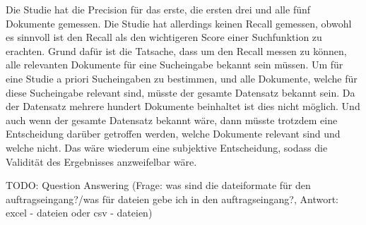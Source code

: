 Die Studie hat die Precision für das erste, die ersten drei und alle fünf Dokumente gemessen.
Die Studie hat allerdings keinen Recall gemessen, obwohl es sinnvoll ist den Recall als den wichtigeren Score einer Suchfunktion zu erachten.
Grund dafür ist die Tatsache, dass um den Recall messen zu können, alle relevanten Dokumente für eine Sucheingabe bekannt sein müssen.
Um für eine Studie a priori Sucheingaben zu bestimmen, und alle Dokumente, welche für diese Sucheingabe relevant sind, müsste der gesamte Datensatz bekannt sein.
Da der Datensatz mehrere hundert Dokumente beinhaltet ist dies nicht möglich.
Und auch wenn der gesamte Datensatz bekannt wäre, dann müsste trotzdem eine Entscheidung darüber getroffen werden, welche Dokumente relevant sind und welche nicht.
Das wäre wiederum eine subjektive Entscheidung, sodass die Validität des Ergebnisses anzweifelbar wäre.

TODO: Question Answering (Frage: was sind die dateiformate für den auftragseingang?/was für dateien gebe ich in den auftragseingang?, Antwort: excel - dateien oder csv - dateien)